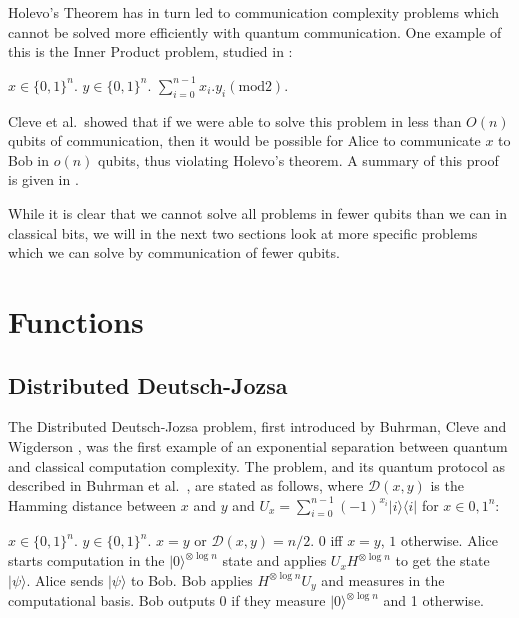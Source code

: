 \documentclass[a4paper]{article}
\begin{document}
        Holevo's Theorem has in turn led to communication complexity problems which cannot be solved more efficiently with quantum communication. One example of this is the Inner Product problem, studied in \cite{Cleve201311}:

        \begin{codebox}
            \zi {} $x \in \{0, 1\}^n$.
            \zi {} $y \in \{0, 1\}^n$.
            \zi {} $\sum_{i = 0}^{n - 1}x_i.y_i (\textrm{mod} 2)$.
        \end{codebox}

        Cleve et al.~showed that if we were able to solve this problem in less than $O(n)$ qubits of communication, then it would be possible for Alice to communicate $x$ to Bob in $o(n)$ qubits, thus violating Holevo's theorem. A summary of this proof is given in \cite{RevModPhys.82.665}.

        While it is clear that we cannot solve all problems in fewer qubits than we can in classical bits, we will in the next two sections look at more specific problems which we can solve by communication of fewer qubits.

    \section{Functions}

        \subsection{Distributed Deutsch-Jozsa}

        The Distributed Deutsch-Jozsa problem, first introduced by Buhrman, Cleve and Wigderson \cite{Buhrman:1998:QVC:276698.276713}, was the first example of an exponential separation between quantum and classical computation complexity. The problem, and its quantum protocol as described in Buhrman et al.~\cite{RevModPhys.82.665}, are stated as follows, where $\mathcal{D}(x, y)$ is the Hamming distance between $x$ and $y$ and $U_x = \sum_{i=0}^{n-1}(-1)^{x_i}|i\rangle\langle i|$ for $x \in {0, 1}^n$:

        \begin{codebox}
            \zi {} $x \in \{0, 1\}^n$.
            \zi {} $y \in \{0, 1\}^n$.
            \zi {} $x = y$ or $\mathcal{D}(x, y) = n/2$.
            \zi {} $0$ iff $x = y$, $1$ otherwise.
            \li Alice starts computation in the $|0\rangle^{\otimes \log n}$ state and applies $U_xH^{\otimes \log n}$ to get the state $|\psi\rangle$.
            \li Alice sends $|\psi\rangle$ to Bob.
            \li Bob applies $H^{\otimes \log n}U_y$ and measures in the computational basis.
            \li Bob outputs $0$ if they measure $|0\rangle^{\otimes \log n}$ and 1 otherwise.
            \End
        \end{codebox}
\end{document}
